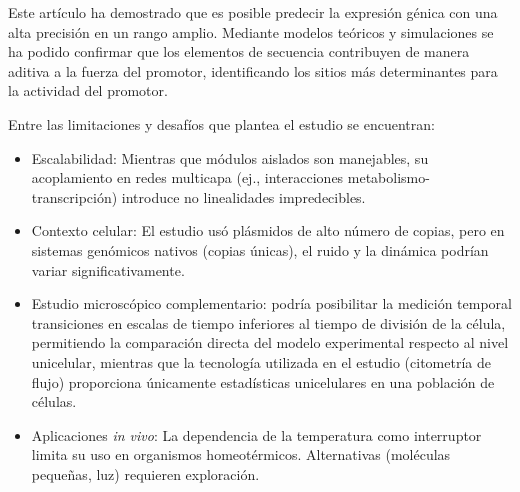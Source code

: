 \documentclass[nochap]{config/ejercicios}
\begin{document}

Este artículo ha demostrado que es posible predecir la expresión génica con una alta precisión en un rango amplio. Mediante modelos teóricos y simulaciones se ha podido confirmar que los elementos de secuencia contribuyen de manera aditiva a la fuerza del promotor, identificando los sitios más determinantes para la actividad del promotor.



Entre las limitaciones y desafíos que plantea el estudio se encuentran:
\begin{itemize}
    \item Escalabilidad: Mientras que módulos aislados son manejables, su acoplamiento en redes multicapa (ej., interacciones metabolismo-transcripción) introduce no linealidades impredecibles.
    \item Contexto celular: El estudio usó plásmidos de alto número de copias, pero en sistemas genómicos nativos (copias únicas), el ruido y la dinámica podrían variar significativamente.
    \item Estudio microscópico complementario: podría posibilitar la medición temporal transiciones en escalas de tiempo inferiores al tiempo de división de la célula, permitiendo la comparación directa del modelo experimental respecto al nivel unicelular, mientras que la tecnología utilizada en el estudio (citometría de flujo) proporciona únicamente estadísticas unicelulares en una población de células.
    \item Aplicaciones \textit{in vivo}: La dependencia de la temperatura como interruptor limita su uso en organismos homeotérmicos. Alternativas (moléculas pequeñas, luz) requieren exploración.
\end{itemize}
\end{document}
